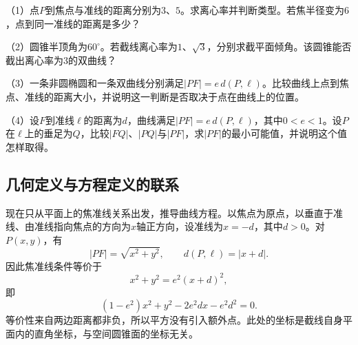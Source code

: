 \begin{exercise}
\mbox{}

\begin{samepage}
（1）点\(P\)到焦点与准线的距离分别为\(3\)、\(5\)。求离心率并判断类型。若焦半径变为\(6\)，点到同一准线的距离是多少？
\par
\end{samepage}

\begin{samepage}
（2）圆锥半顶角为\(60^\circ\)。若截线离心率为\(1\)、\(\sqrt3\)，分别求截平面倾角。该圆锥能否截出离心率为\(3\)的双曲线？
\par
\end{samepage}

\begin{samepage}
（3）一条非圆椭圆和一条双曲线分别满足\(|PF|=e\,d(P,\ell)\)。比较曲线上点到焦点、准线的距离大小，并说明这一判断是否取决于点在曲线上的位置。
\par
\end{samepage}

\begin{samepage}
（4）设\(F\)到准线\(\ell\)的距离为\(d\)，曲线满足\(|PF|=e\,d(P,\ell)\)，其中\(0<e<1\)。设\(P\)在\(\ell\)上的垂足为\(Q\)，比较\(|FQ|\)、\(|PQ|\)与\(|PF|\)，求\(|PF|\)的最小可能值，并说明这个值怎样取得。
\par
\end{samepage}
\end{exercise}

\subsection{几何定义与方程定义的联系}
\label{subsec:quadratic-geometric-and-algebraic-definitions}

现在只从平面上的焦准线关系出发，推导曲线方程。以焦点为原点，以垂直于准线、由准线指向焦点的方向为\(x\)轴正方向，设准线为\(x=-d\)，其中\(d>0\)。对\(P(x,y)\)，有
\begin{equation*}
    |PF|=\sqrt{x^2+y^2} , \qquad d(P,\ell)=|x+d| .
\end{equation*}
因此焦准线条件等价于
\begin{equation}\label{eq:quadratic-common-focus-equation}
    x^2+y^2=e^2(x+d)^2 ,
\end{equation}
即
\begin{equation}\label{eq:quadratic-common-eccentricity-equation}
    (1-e^2)x^2+y^2-2e^2dx-e^2d^2=0 .
\end{equation}
等价性来自两边距离都非负，所以平方没有引入额外点。此处的坐标是截线自身平面内的直角坐标，与空间圆锥面的坐标无关。

